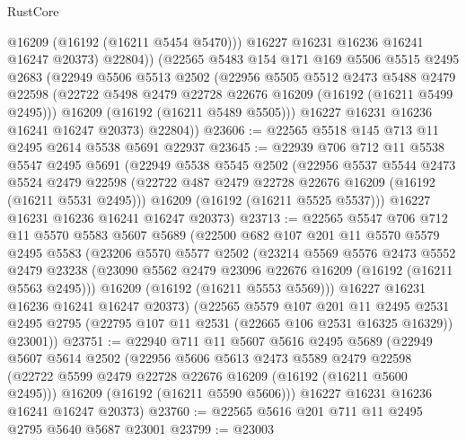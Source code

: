 \begin{lexlean}{RustCore}
\begin{coremodule}
              @16209
              (@16192 (@16211 @5454 @5470)))
            @16227
            @16231
            @16236
            @16241
            @16247
            @20373)
          @22804))
      (@22565
        @5483
        @154
        @171
        @169
        @5506
        @5515
        @2495
        @2683
        (@22949
          @5506
          @5513
          @2502
          (@22956
            @5505
            @5512
            @2473
            @5488
            @2479
            @22598
            (@22722 @5498 @2479 @22728 @22676 @16209 (@16192 (@16211 @5499 @2495)))
            @16209
            (@16192 (@16211 @5489 @5505)))
          @16227
          @16231
          @16236
          @16241
          @16247
          @20373)
        @22804))
@23606 := @22565 @5518 @145 @713 @11 @2495 @2614 @5538 @5691 @22937
@23645 := @22939
    @706
    @712
    @11
    @5538
    @5547
    @2495
    @5691
    (@22949
      @5538
      @5545
      @2502
      (@22956
        @5537
        @5544
        @2473
        @5524
        @2479
        @22598
        (@22722 @487 @2479 @22728 @22676 @16209 (@16192 (@16211 @5531 @2495)))
        @16209
        (@16192 (@16211 @5525 @5537)))
      @16227
      @16231
      @16236
      @16241
      @16247
      @20373)
@23713 := @22565
    @5547
    @706
    @712
    @11
    @5570
    @5583
    @5607
    @5689
    (@22500
      @682
      @107
      @201
      @11
      @5570
      @5579
      @2495
      @5583
      (@23206
        @5570
        @5577
        @2502
        (@23214
          @5569
          @5576
          @2473
          @5552
          @2479
          @23238
          (@23090 @5562 @2479 @23096 @22676 @16209 (@16192 (@16211 @5563 @2495)))
          @16209
          (@16192 (@16211 @5553 @5569)))
        @16227
        @16231
        @16236
        @16241
        @16247
        @20373)
      (@22565
        @5579
        @107
        @201
        @11
        @2495
        @2531
        @2495
        @2795
        (@22795 @107 @11 @2531 (@22665 @106 @2531 @16325 @16329))
        @23001))
@23751 := @22940
    @711
    @11
    @5607
    @5616
    @2495
    @5689
    (@22949
      @5607
      @5614
      @2502
      (@22956
        @5606
        @5613
        @2473
        @5589
        @2479
        @22598
        (@22722 @5599 @2479 @22728 @22676 @16209 (@16192 (@16211 @5600 @2495)))
        @16209
        (@16192 (@16211 @5590 @5606)))
      @16227
      @16231
      @16236
      @16241
      @16247
      @20373)
@23760 := @22565 @5616 @201 @711 @11 @2495 @2795 @5640 @5687 @23001
@23799 := @23003

\end{coremodule}
\end{lexlean}
